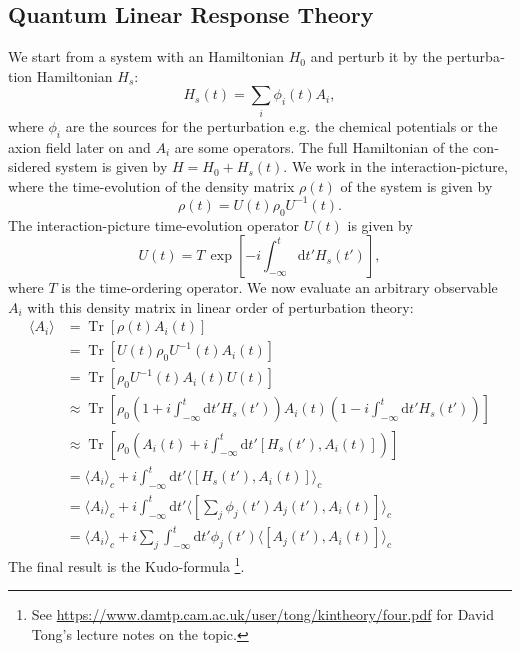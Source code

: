 \documentclass[master,       %
               twoside,        %
               BCOR10mm,       %
               english,ngerman, %
               ]{GAUBM}
\begin{document}
\begin{otherlanguage}{english}
\section{Quantum Linear Response Theory}
We start from a system with an Hamiltonian $H_0$ and perturb it by the perturbation Hamiltonian $H_s$:
\begin{equation}
	H_s(t) = \sum_i \phi_i(t) A_i,
\end{equation}
where $\phi_i$ are the sources for the perturbation e.g. 
the chemical potentials or the axion field later on
and $A_i$ are some operators.
The full Hamiltonian of the considered system is given by $H = H_0 + H_s(t)$.
We work in the interaction-picture, where the time-evolution of the density matrix $\rho(t)$ of the system is given by
\begin{equation}
    \rho(t) = U(t) \rho_0 U^{-1}(t).
\end{equation}
The interaction-picture time-evolution operator $U(t)$ is given by
\begin{equation}
    U(t) = T \, \exp \left[ - i \int_{-\infty}^t  \mathrm{d} t' H_s(t') \right],
\end{equation}
where $T$ is the time-ordering operator.
We now evaluate an arbitrary observable $A_i$ with this density matrix in linear order of perturbation theory:
\begin{align}
	\label{eq:linear_response}
    \langle A_i \rangle &= \operatorname{Tr} \left[ \rho(t) A_i(t) \right] \nonumber \\
    &= \operatorname{Tr} \left[ U(t) \rho_0 U^{-1}(t) A_i(t) \right] \nonumber \\
    &= \operatorname{Tr} \left[ \rho_0 U^{-1}(t) A_i(t) U(t) \right] \nonumber \\
    &\approx \operatorname{Tr} \left[ \rho_0 (1 + i \int_{-\infty}^t \mathrm{d} t' H_s(t')) A_i(t) (1 - i \int_{-\infty}^t \mathrm{d} t' H_s(t')) \right] \nonumber \\
    &\approx \operatorname{Tr} \left[ \rho_0 (A_i(t) + i \int_{-\infty}^t \mathrm{d} t' [H_s(t'), A_i(t)] ) \right] \nonumber \\
    &= \langle A_i \rangle_c + i \int_{-\infty}^t \mathrm{d} t' \langle [H_s(t'), A_i(t)] \rangle_c \nonumber \\
    &= \langle A_i \rangle_c + i \int_{-\infty}^t \mathrm{d} t' \langle [\sum_j \phi_j(t') A_j(t'), A_i(t)] \rangle_c  \nonumber \\
    &= \langle A_i \rangle_c + i \sum_j \int_{-\infty}^t \mathrm{d} t' \phi_j(t') \langle [A_j(t'), A_i(t)] \rangle_c
\end{align}
The final result is the Kudo-formula \footnote{See \url{https://www.damtp.cam.ac.uk/user/tong/kintheory/four.pdf} for David Tong's lecture notes on the topic.}.



\end{otherlanguage}
\end{document}
